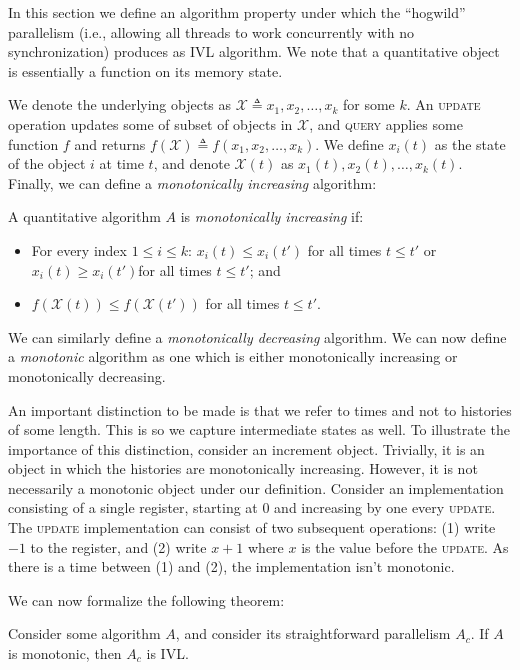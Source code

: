 In this section we define an algorithm property under which the ``hogwild'' parallelism
(i.e., allowing all threads to work concurrently with no synchronization) produces as IVL
algorithm. We note that a quantitative object is essentially a function on its memory
state.

We denote the underlying objects as $\mathcal{X} \triangleq x_1,x_2,\dots, x_k$ for some $k$. An \textsc{update} operation
updates some of subset of objects in $\mathcal{X}$, and \textsc{query} applies some function $f$ and returns
$f(\mathcal{X}) \triangleq f(x_1,x_2,\dots,x_k)$. We define $x_i(t)$ as the state of the object $i$ at time $t$,
and denote $\mathcal{X}(t)$ as $x_1(t), x_2(t), \dots, x_k(t)$.
Finally, we can define a \emph{monotonically increasing} algorithm:
\begin{definition}
    A quantitative algorithm $A$ is \emph{monotonically increasing} if:
    \begin{itemize}
        \item For every index $1 \leq i \leq k$: $x_i(t) \leq x_i(t')$ for all times $t \leq t'$ or $x_i(t) \geq x_i(t')$for all times $t \leq t'$; and
        \item $f(\mathcal{X}(t)) \leq f(\mathcal{X}(t'))$ for all times $t \leq t'$.
    \end{itemize}
\end{definition}

We can similarly define a \emph{monotonically decreasing} algorithm. We can now define a \emph{monotonic}
algorithm as one which is either monotonically increasing or monotonically decreasing.

An important distinction to be made is that we refer to times and not to histories of some length. This is so
we capture intermediate states as well. To illustrate the importance of this distinction, consider an increment
object. Trivially, it is an object in which the histories are monotonically increasing. However, it is not necessarily
a monotonic object under our definition. Consider an implementation consisting of a single register, starting at
$0$ and increasing by one every \textsc{update}. The \textsc{update} implementation can consist of two subsequent
operations: (1) write $-1$ to the register, and (2) write $x+1$ where $x$ is the value before the \textsc{update}. As
there is a time between (1) and (2), the implementation isn't monotonic.

We can now formalize the following theorem:
\begin{theorem}
    Consider some algorithm $A$, and consider its straightforward parallelism $A_c$. If $A$ is monotonic,
    then $A_c$ is IVL.
\end{theorem}

